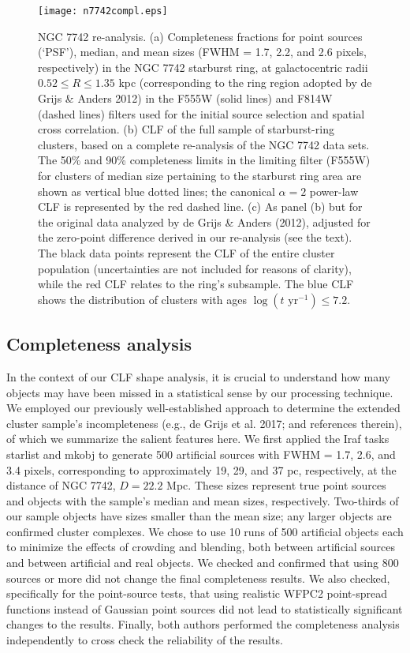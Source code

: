 \documentclass{raa}            %
\begin{document}
\begin{figure}[h!]
\begin{center}
\texttt{[image: n7742compl.eps]}
\caption{NGC 7742 re-analysis. (a) Completeness fractions for point
  sources (`PSF'), median, and mean sizes (FWHM = 1.7, 2.2, and 2.6
  pixels, respectively) in the NGC 7742 starburst ring, at
  galactocentric radii $0.52 \le R \le 1.35$ kpc (corresponding to the
  ring region adopted by de Grijs \& Anders 2012) in the F555W (solid
  lines) and F814W (dashed lines) filters used for the initial source
  selection and spatial cross correlation. (b) CLF of the full sample
  of starburst-ring clusters, based on a complete re-analysis of the
  NGC 7742 data sets. The 50\% and 90\% completeness limits in the
  limiting filter (F555W) for clusters of median size pertaining to
  the starburst ring area are shown as vertical blue dotted lines; the
  canonical $\alpha = 2$ power-law CLF is represented by the red
  dashed line. (c) As panel (b) but for the original data analyzed by
  de Grijs \& Anders (2012), adjusted for the zero-point difference
  derived in our re-analysis (see the text). The black data points
  represent the CLF of the entire cluster population (uncertainties
  are not included for reasons of clarity), while the red CLF relates
  to the ring's subsample. The blue CLF shows the distribution of
  clusters with ages $\log( t \mbox{ yr}^{-1}) \le 7.2$.}
\label{n7742.fig}
\end{center}
\end{figure}

\subsection{Completeness analysis}

In the context of our CLF shape analysis, it is crucial to understand
how many objects may have been missed in a statistical sense by our
processing technique. We employed our previously well-established
approach to determine the extended cluster sample's incompleteness
(e.g., de Grijs et al. 2017; and references therein), of which we
summarize the salient features here. We first applied the {\sc Iraf}
tasks {\sc starlist} and {\sc mkobj} to generate 500 artificial
sources with FWHM = 1.7, 2.6, and 3.4 pixels, corresponding to
approximately 19, 29, and 37 pc, respectively, at the distance of NGC
7742, $D = 22.2$ Mpc. These sizes represent true point sources and
objects with the sample's median and mean sizes,
respectively. Two-thirds of our sample objects have sizes smaller than
the mean size; any larger objects are confirmed cluster complexes. We
chose to use 10 runs of 500 artificial objects each to minimize the
effects of crowding and blending, both between artificial sources and
between artificial and real objects. We checked and confirmed that
using 800 sources or more did not change the final completeness
results. We also checked, specifically for the point-source tests,
that using realistic WFPC2 point-spread functions instead of Gaussian
point sources did not lead to statistically significant changes to the
results. Finally, both authors performed the completeness analysis
independently to cross check the reliability of the results.
\end{document}
